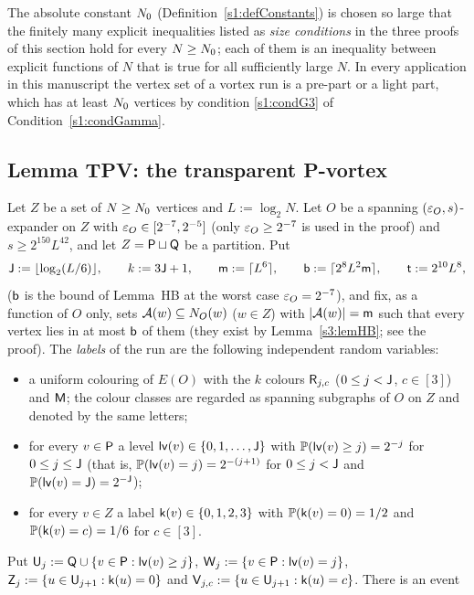 \smallskip
The absolute constant $N_{0}$ (Definition~\ref{s1:defConstants}) is chosen so large that the finitely many
explicit inequalities listed as \emph{size conditions} in the three proofs of this section hold for every
$N\ge N_{0}$; each of them is an inequality between explicit functions of $N$ that is true for all sufficiently
large $N$. In every application in this manuscript the vertex set of a vortex run
is a pre-part or a light part, which has at least $N_{0}$ vertices by condition \ref{s1:condG3} of Condition~\ref{s1:condGamma}.

\subsection{Lemma TPV: the transparent P-vortex}\label{s4:ssecTPV}

\begin{lemma}\label{s4:lemTPV}
Let $Z$ be a set of $N\ge N_{0}$ vertices and $L:=\log_2N$. Let $O$ be a spanning $(\varepsilon_O,s)$-expander on $Z$ with
$\varepsilon_O\in[2^{-7},2^{-5}]$ (only $\varepsilon_O\ge2^{-7}$ is used in the proof) and $s\ge2^{150}L^{42}$, and let $Z=\mathsf{P}\sqcup\mathsf{Q}$ be a partition. Put
\[
\mathsf{J}:=\lfloor\log_2(L/6)\rfloor,\qquad k:=3\mathsf{J}+1,\qquad \mathsf{m}:=\lceil L^6\rceil,\qquad
\mathsf{b}:=\lceil2^8L^2\mathsf{m}\rceil,\qquad \mathsf{t}:=2^{10}L^8,
\]
($\mathsf{b}$ is the bound of Lemma~HB at the worst case $\varepsilon_O=2^{-7}$),
and fix, as a function of $O$ only, sets $\mathcal{A}(w)\subseteq N_O(w)$ ($w\in Z$) with $|\mathcal{A}(w)|=\mathsf{m}$ such that every vertex
lies in at most $\mathsf{b}$ of them (they exist by Lemma~\ref{s3:lemHB}; see the proof). The \emph{labels} of the run are
the following independent random variables:
\begin{itemize}
\item[(a)] a uniform colouring of $E(O)$ with the $k$ colours $\mathsf{R}_{j,c}$ ($0\le j<\mathsf{J}$, $c\in[3]$) and $\mathsf{M}$; the
  colour classes are regarded as spanning subgraphs of $O$ on $Z$ and denoted by the same letters;
\item[(b)] for every $v\in\mathsf{P}$ a level $\mathsf{lv}(v)\in\{0,1,\dots,\mathsf{J}\}$ with $\mathbb{P}(\mathsf{lv}(v)\ge j)=2^{-j}$ for
  $0\le j\le\mathsf{J}$ (that is, $\mathbb{P}(\mathsf{lv}(v)=j)=2^{-(j+1)}$ for $0\le j<\mathsf{J}$ and $\mathbb{P}(\mathsf{lv}(v)=\mathsf{J})=2^{-\mathsf{J}}$);
\item[(c)] for every $v\in Z$ a label $\mathsf{k}(v)\in\{0,1,2,3\}$ with $\mathbb{P}(\mathsf{k}(v)=0)=1/2$ and
  $\mathbb{P}(\mathsf{k}(v)=c)=1/6$ for $c\in[3]$.
\end{itemize}
Put $\mathsf{U}_j:=\mathsf{Q}\cup\{v\in\mathsf{P}:\mathsf{lv}(v)\ge j\}$, $\mathsf{W}_j:=\{v\in\mathsf{P}:\mathsf{lv}(v)=j\}$,
$\mathsf{Z}_j:=\{u\in\mathsf{U}_{j+1}:\mathsf{k}(u)=0\}$ and $\mathsf{V}_{j,c}:=\{u\in\mathsf{U}_{j+1}:\mathsf{k}(u)=c\}$. There is an event

\end{lemma}
